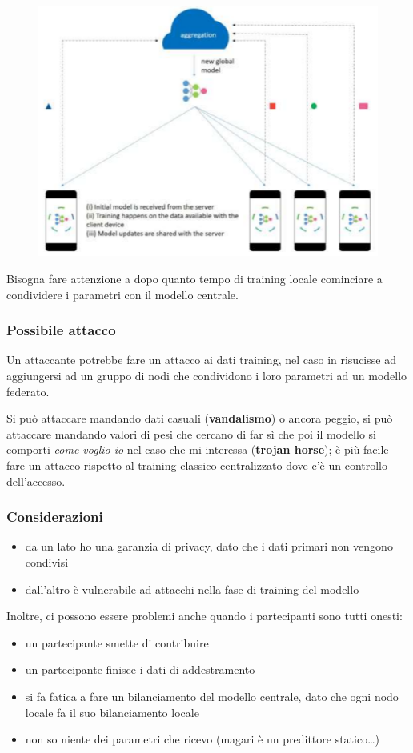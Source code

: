 \documentclass{report}
\begin{document}
\begin{figure}[H]
    \centering
    \includegraphics[width=0.8\linewidth]{images/fedrated-learning.png}
\end{figure}

\noindent Bisogna fare attenzione a dopo quanto tempo di training locale cominciare a condividere i parametri 
con il modello centrale.

\subsubsection{Possibile attacco}
Un attaccante potrebbe fare un attacco ai dati training, nel caso in risucisse ad aggiungersi ad un gruppo di nodi che condividono i loro 
parametri ad un modello federato.

\noindent Si può attaccare mandando dati casuali (\textbf{vandalismo}) o ancora peggio, si può attaccare mandando valori di pesi che cercano di 
far sì che poi il modello si comporti \textit{come voglio io} nel caso che mi interessa (\textbf{trojan horse}); è più facile fare un attacco 
rispetto al training classico centralizzato dove c'è un controllo dell'accesso.

\subsubsection{Considerazioni}

\begin{itemize}
    \item da un lato ho una garanzia di privacy, dato che i dati primari non vengono condivisi
    \item dall'altro è vulnerabile ad attacchi nella fase di training del modello 
\end{itemize}


\noindent Inoltre, ci possono essere problemi anche quando i partecipanti sono tutti onesti:
\begin{itemize}
    \item un partecipante smette di contribuire 
    \item un partecipante finisce i dati di addestramento 
    \item si fa fatica a fare un bilanciamento del modello centrale, dato che ogni nodo locale fa il suo bilanciamento locale 
    \item non so niente dei parametri che ricevo (magari è un predittore statico\dots)
\end{itemize}
\end{document}
